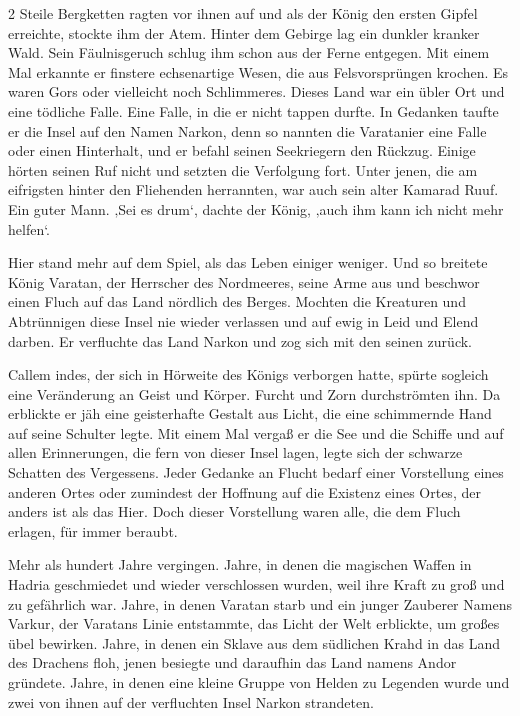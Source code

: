 \documentclass[10pt, a4paper, oneside]{book}
\begin{document}
\begin{multicols}{2}
Steile Bergketten ragten vor ihnen auf und als der König den ersten Gipfel erreichte, stockte ihm der Atem. Hinter dem Gebirge lag ein dunkler kranker Wald. Sein Fäulnisgeruch schlug ihm schon aus der Ferne entgegen. Mit einem Mal erkannte er finstere echsenartige Wesen, die aus Felsvorsprüngen krochen. Es waren Gors oder vielleicht noch Schlimmeres. Dieses Land war ein übler Ort und eine tödliche Falle. Eine Falle, in die er nicht tappen durfte. In Gedanken taufte er die Insel auf den Namen Narkon, denn so nannten die Varatanier eine Falle oder einen Hinterhalt, und er befahl seinen Seekriegern den Rückzug. Einige hörten seinen Ruf nicht und setzten die Verfolgung fort. Unter jenen, die am eifrigsten hinter den Fliehenden herrannten, war auch sein alter Kamarad Ruuf. Ein guter Mann. ‚Sei es drum‘, dachte der König, ‚auch ihm kann ich nicht mehr helfen‘.

Hier stand mehr auf dem Spiel, als das Leben einiger weniger. Und so breitete König Varatan, der Herrscher des Nordmeeres, seine Arme aus und beschwor einen Fluch auf das Land nördlich des Berges. Mochten die Kreaturen und Abtrünnigen diese Insel nie wieder verlassen und auf ewig in Leid und Elend darben. Er verfluchte das Land Narkon und zog sich mit den seinen zurück.\bigskip

Callem indes, der sich in Hörweite des Königs verborgen hatte, spürte sogleich eine Veränderung an Geist und Körper. Furcht und Zorn durchströmten ihn. Da erblickte er jäh eine geisterhafte Gestalt aus Licht, die eine schimmernde Hand auf seine Schulter legte. Mit einem Mal vergaß er die See und die Schiffe und auf allen Erinnerungen, die fern von dieser Insel lagen, legte sich der schwarze Schatten des Vergessens. Jeder Gedanke an Flucht bedarf einer Vorstellung eines anderen Ortes oder zumindest der Hoffnung auf die Existenz eines Ortes, der anders ist als das Hier. Doch dieser Vorstellung waren alle, die dem Fluch erlagen, für immer beraubt.\bigskip

Mehr als hundert Jahre vergingen. Jahre, in denen die magischen Waffen in Hadria geschmiedet und wieder verschlossen wurden, weil ihre Kraft zu groß und zu gefährlich war. Jahre, in denen Varatan starb und ein junger Zauberer Namens Varkur, der Varatans Linie entstammte, das Licht der Welt erblickte, um großes übel bewirken. Jahre, in denen ein Sklave aus dem südlichen Krahd in das Land des Drachens floh,  jenen besiegte und daraufhin das Land namens Andor gründete. Jahre, in denen eine kleine Gruppe von Helden zu Legenden wurde und zwei von ihnen auf der verfluchten Insel Narkon strandeten.\bigskip


\end{multicols}
\end{document}
